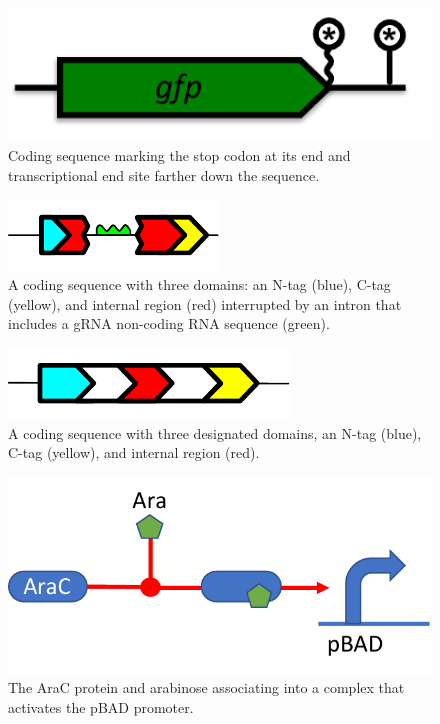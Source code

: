 {\begin{figure}[h!]
\includegraphics[scale=0.5]{figures/apdx-examples/apdx-exa18-stop-sites.pdf}
\caption{Coding sequence marking the stop codon  at its end and transcriptional end site farther down the sequence.}
\label{f:apdx:exa18}
\end{figure}

\begin{figure}[h!]
\includegraphics[scale=1.0]{figures/apdx-examples/apdx-exa19-intron.pdf}
\caption{A coding sequence with three domains: an N-tag (blue), C-tag (yellow), and internal region (red) interrupted by an intron that includes a gRNA non-coding RNA sequence (green).}
\label{f:apdx:exa19}
\end{figure}

\begin{figure}[h!]
\includegraphics[scale=1.0]{figures/apdx-examples/apdx-exa20-polypeptide-region.pdf}
\caption{A coding sequence with three designated domains, an N-tag (blue), C-tag (yellow), and internal region (red).}
\label{f:apdx:exa20}
\end{figure}

\begin{figure}[h!]
\includegraphics[scale=0.75]{figures/apdx-examples/apdx-exa21.pdf}
\caption{The AraC protein and arabinose associating into a complex that activates the pBAD promoter.}
\label{f:apdx:exa21}
\end{figure}

}



